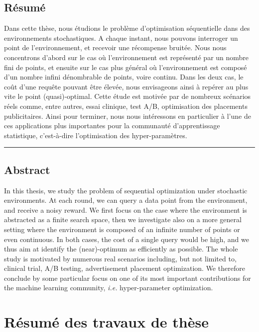 \section*{\centering R\'esum\'e}

Dans cette th\`ese, nous \'etudions le probl\`eme d'optimisation s\'equentielle dans des enviro\-nnements stochastiques. A chaque instant, nous pouvons interroger un point de l'enviro\-nnement, et recevoir une récompense bruit\'ee. Nous nous concentrons d'abord sur le cas o\`u l'environnement est représenté par un nombre fini de points, et ensuite sur le cas plus g\'en\'eral o\`u l'environnement est composé d'un nombre infini d\'enombrable de points, voire continu. Dans les deux cas, le co\^ut d'une requ\^ete pouvant \^etre \'elev\'ee, nous envisageons ainsi \`a rep\'erer au plus vite le point (quasi)-optimal. Cette \'etude est motiv\'ee par de nombreux sc\'enarios r\'eels comme, entre autres, essai clinique, test A/B, optimisation des placements publicitaires. Ainsi pour terminer, nous nous int\'eressons en particulier \`a l'une de ces applications plus importantes pour la communaut\'e d'apprentissage statistique, c'est-\`a-dire l'optimisation des hyper-param\`etres.

\begin{center}
    \rule{8cm}{0.4pt}
\end{center}

\section*{\centering Abstract}

In this thesis, we study the problem of sequential optimization under stochastic environments. At each round, we can query a data point from the environment, and receive a noisy reward. We first focus on the case where the environment is abstracted as a finite search space, then we investigate also on a more general setting where the environment is composed of an infinite number of points or even continuous. In both cases, the cost of a single query would be high, and we thus aim at identify the (near)-optimum as efficiently as possible. The whole study is motivated by numerous real scenarios including, but not limited to, clinical trial, A/B testing, advertisement placement optimization. We therefore conclude by some particular focus on one of its most important contributions for the machine learning community, \emph{i.e.} hyper-parameter optimization.


\chapter*{R\'esum\'e des travaux de thèse}
